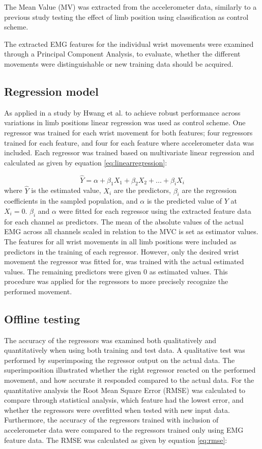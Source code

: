 \begin{multicols}{2}
The Mean Value (MV) was extracted from the accelerometer data, similarly to a previous study \cite{Krasoulis2015} testing the effect of limb position using classification as control scheme. 

The extracted EMG features for the individual wrist movements were examined through a Principal Component Analysis, to evaluate, whether the different movements were distinguishable or new training data should be acquired.

\subsection*{Regression model}
As applied in a study by Hwang et al. \cite{hwang2017} to achieve robust performance across variations in limb positions linear regression was used as control scheme. One regressor was trained for each wrist movement for both features; four regressors trained for each feature, and four for each feature where accelerometer data was included. Each regressor was trained based on multivariate linear regression and calculated as given by equation \ref{eq:linearregression}:

\begin{equation} \label{eq:linearregression}
\hat{Y} = \alpha + \beta_1 X_{1} + \beta_2 X_{2} + ... + \beta_i X_{i}
\end{equation}
where $\hat{Y}$ is the estimated value, $X_i$ are the predictors, $\beta_i$ are the regression coefficients in the sampled population, and $\alpha$ is the predicted value of $Y$ at $X_{i} = 0$. $\beta_i$ and $\alpha$ were fitted for each regressor using the extracted feature data for each channel as predictors. The mean of the absolute values of the actual EMG across all channels scaled in relation to the MVC is set as estimator values. The features for all wrist movements in all limb positions were included as predictors in the training of each regressor. However, only the desired wrist movement the regressor was fitted for, was trained with the actual estimated values. The remaining predictors were given 0 as estimated values. This procedure was applied for the regressors to more precisely recognize the performed movement.

\subsection*{Offline testing}
The accuracy of the regressors was examined both qualitatively and quantitatively when using both training and test data. A qualitative test was performed by superimposing the regressor output on the actual data. The superimposition illustrated whether the right regressor reacted on the performed movement, and how accurate it responded compared to the actual data. For the quantitative analysis the Root Mean Square Error (RMSE) was calculated to compare through statistical analysis, which feature had the lowest error, and whether the regressors were overfitted when tested with new input data. Furthermore, the accuracy of the regressors trained with inclusion of accelerometer data were compared to the regressors trained only using EMG feature data. The RMSE was calculated as given by equation \ref{eq:rmse}:


\end{multicols}
